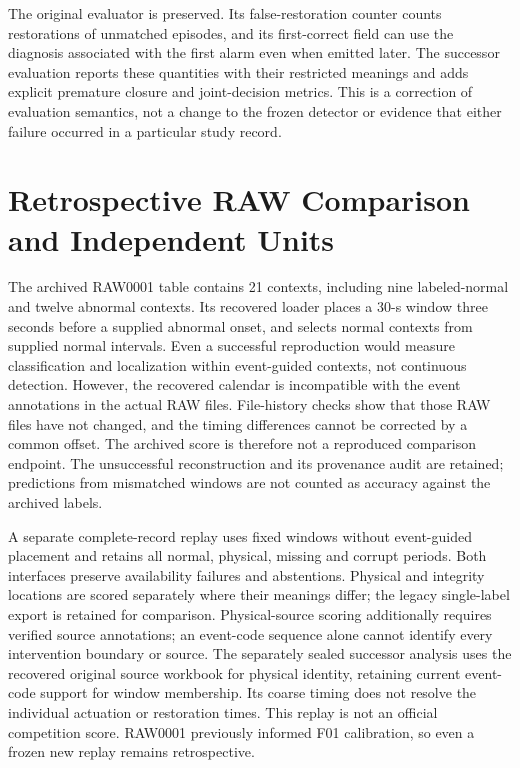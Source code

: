 The original evaluator is preserved. Its false-restoration
counter counts restorations of unmatched episodes, and its
first-correct field can use the diagnosis associated with the
first alarm even when emitted later. The successor evaluation reports these
quantities with their restricted meanings and adds explicit premature
closure and joint-decision metrics. This is a correction of evaluation
semantics, not a change to the frozen detector or evidence that either
failure occurred in a particular study record.

\section{Retrospective RAW Comparison and Independent Units}
\label{app:raw-contract}

The archived RAW0001 table contains 21 contexts, including nine labeled-normal
and twelve abnormal contexts. Its recovered loader places a 30-s window
three seconds before a supplied abnormal onset, and selects normal contexts
from supplied normal intervals. Even a successful reproduction would measure
classification and localization within event-guided contexts, not continuous
detection. However, the recovered calendar is incompatible with the event
annotations in the actual RAW files. File-history checks show that those
RAW files have not changed, and the timing differences cannot be corrected
by a common offset. The archived score is therefore not a reproduced
comparison endpoint. The unsuccessful reconstruction and its provenance
audit are retained; predictions from mismatched windows are not counted as
accuracy against the archived labels.

A separate complete-record replay uses fixed windows without event-guided
placement and retains all normal, physical, missing and corrupt periods.
Both interfaces preserve availability failures and abstentions. Physical
and integrity locations are scored separately where their meanings differ;
the legacy single-label export is retained for comparison. Physical-source
scoring additionally requires verified source annotations; an event-code
sequence alone cannot identify every intervention boundary or source.
The separately sealed successor analysis uses the recovered original
source workbook for physical identity, retaining current event-code
support for window membership. Its coarse timing does not resolve the
individual actuation or restoration times.
This replay is not an official competition score. RAW0001 previously informed F01
calibration, so even a frozen new replay remains retrospective.

